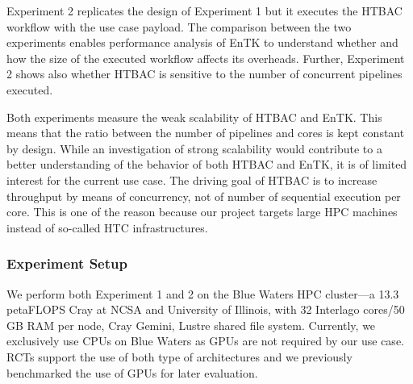 Experiment 2 replicates the design of Experiment 1 but it executes the HTBAC
workflow with the use case payload. The comparison between the two
experiments enables performance analysis of EnTK to understand whether and
how the size of the executed workflow affects its overheads. Further,
Experiment 2 shows also whether HTBAC is sensitive to the number of
concurrent pipelines executed.


Both experiments measure the weak scalability of HTBAC and EnTK\@. This means
that the ratio between the number of pipelines and cores is kept constant by
design. While an investigation of strong scalability would contribute to a
better understanding of the behavior of both HTBAC and EnTK, it is of limited
interest for the current use case. The driving goal of HTBAC is to increase
throughput by means of concurrency, not of number of sequential execution per
core. This is one of the reason because our project targets large HPC
machines instead of so-called HTC infrastructures.


\subsubsection{Experiment Setup}

We perform both Experiment 1 and 2 %
on the Blue Waters HPC cluster---a 13.3 petaFLOPS Cray at NCSA and University
of Illinois, with 32 Interlago cores/50 GB RAM per node, Cray Gemini, Lustre
shared file system. Currently, we exclusively use CPUs on Blue Waters as GPUs
are not required by our use case. RCTs support the use of both type of
architectures and we previously benchmarked the use of GPUs for later
evaluation.


